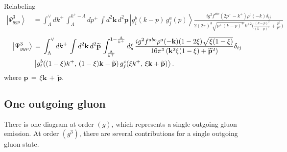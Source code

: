 \documentclass[aps,prd,amsmath,amssymb,nofootinbib]{revtex4-2}
\numberwithin{equation}{section}
\begin{document}
Relabeling 
\begin{align}
\left|\Psi_{gg\rho}^{3}\right\rangle \,& =\int_{\Lambda}^{\vee}dk^{+}\,\int_{\Lambda}^{k^{+}-\Lambda}dp^{+}\,\int d^{2}\mathbf{k}\, d^{2}\mathbf{p}\,\left|g_{i}^{b}(k-p)\, g_{j}^{a}(p)\right\rangle  \frac{ig^{2}f^{abc}(2p^{+}-k^{+})\rho^{c}(-k)\delta_{ij}}{2(2\pi)^{3}\sqrt{p^{+}(k-p)^{+}}k^{+ 2}\bigg(\frac{(k-p)^{2}}{(k-p)^{+}}+\frac{p^{2}}{p^{+}}\bigg)}
\end{align}
\begin{align}\label{contgg3}
\left|\Psi_{gg\rho}^{3}\right\rangle \,& =\,\int_{\Lambda}^{\vee}dk^{+}\,\int d^{2}\mathbf{k}\,d^{2}\widetilde{\mathbf{p}}\,\int_{\frac{\Lambda}{k^{+}}}^{1-\frac{\Lambda}{k^{+}}}d\xi\,\frac{ig^{2}f^{abc}\rho^{a}(-\mathbf{k})(1-2\xi)\sqrt{\xi(1-\xi)}}{16\pi^{3}\left(\mathbf{k}^{2}\xi(1-\xi)+\widetilde{\mathbf{p}}^{2}\right)}\delta_{ij}\notag \\ & \left|g_{i}^{b}((1-\xi)k^{+},\,(1-\xi)\mathbf{k}-\widetilde{\mathbf{p}})\,g_{j}^{c}(\xi k^{+},\,\xi\mathbf{k}+\widetilde{\mathbf{p}})\right\rangle .\end{align}
where $\mathbf{p}\,=\,\xi \mathbf{k}\,+\,\widetilde{\mathbf{p}}$. 
\subsection{One outgoing gluon}
There is one diagram at order $(g)$, which represents a single outgoing gluon emission. At order $(g^{3})$, there are several contributions for a single outgoing gluon state. 
\end{document}
